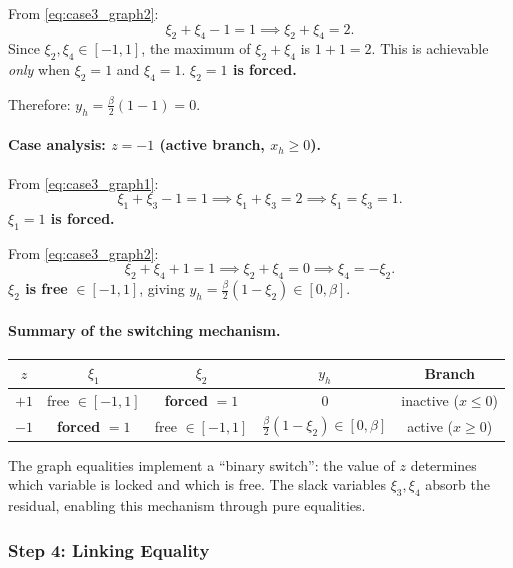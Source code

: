 \documentclass{article}
\begin{document}
From \eqref{eq:case3_graph2}:
\[
\xi_2 + \xi_4 - 1 = 1 \implies \xi_2 + \xi_4 = 2.
\]
Since $\xi_2, \xi_4 \in [-1,1]$, the maximum of $\xi_2 + \xi_4$ is $1 + 1 = 2$. This is achievable \emph{only} when $\xi_2 = 1$ and $\xi_4 = 1$. \textbf{$\xi_2 = 1$ is forced.}

Therefore: $y_h = \tfrac{\beta}{2}(1 - 1) = 0$. \checkmark

\paragraph{Case analysis: $z = -1$ (active branch, $x_h \geq 0$).}

From \eqref{eq:case3_graph1}:
\[
\xi_1 + \xi_3 - 1 = 1 \implies \xi_1 + \xi_3 = 2 \implies \xi_1 = \xi_3 = 1.
\]
\textbf{$\xi_1 = 1$ is forced.}

From \eqref{eq:case3_graph2}:
\[
\xi_2 + \xi_4 + 1 = 1 \implies \xi_2 + \xi_4 = 0 \implies \xi_4 = -\xi_2.
\]
\textbf{$\xi_2$ is free} $\in [-1, 1]$, giving $y_h = \tfrac{\beta}{2}(1 - \xi_2) \in [0, \beta]$.

\paragraph{Summary of the switching mechanism.}

\begin{center}
\begin{tabular}{@{}ccccc@{}}
\toprule
$z$ & $\xi_1$ & $\xi_2$ & $y_h$ & Branch \\
\midrule
$+1$ & free $\in [-1,1]$ & \textbf{forced} $= 1$ & $0$ & inactive ($x \leq 0$) \\
$-1$ & \textbf{forced} $= 1$ & free $\in [-1,1]$ & $\frac{\beta}{2}(1-\xi_2) \in [0,\beta]$ & active ($x \geq 0$) \\
\bottomrule
\end{tabular}
\end{center}

The graph equalities implement a ``binary switch'': the value of $z$ determines which variable is locked and which is free. The slack variables $\xi_3, \xi_4$ absorb the residual, enabling this mechanism through pure equalities.

\subsubsection{Step 4: Linking Equality}
\label{sec:step4_linking}
\end{document}

